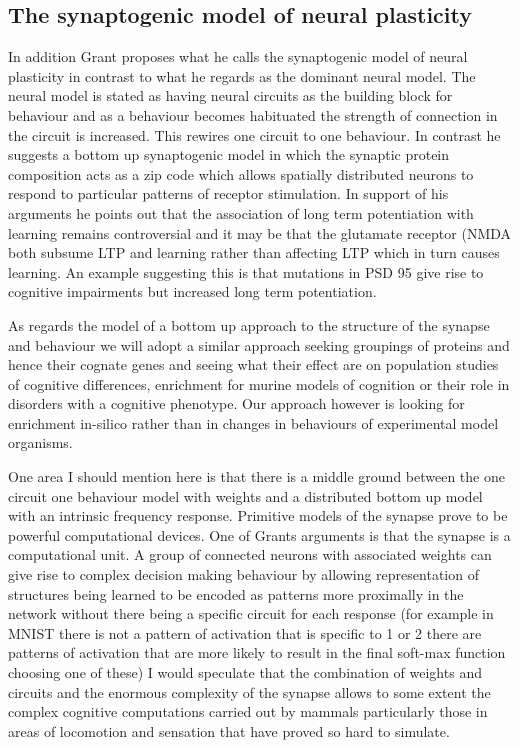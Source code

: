 \subsection{The synaptogenic model of neural plasticity}
In addition Grant proposes what he calls the synaptogenic model of neural plasticity in contrast to what he regards as the dominant neural model. The neural model is stated as having neural circuits as the building block for behaviour and as a behaviour becomes habituated the strength of connection in the circuit is increased. This rewires one circuit to one behaviour. In contrast he suggests a bottom up synaptogenic model in which the synaptic protein composition acts as a zip code which allows spatially distributed neurons to respond to particular patterns of receptor stimulation. In support of his arguments he points out that the association of long term potentiation with learning remains controversial and it may be that the glutamate receptor (NMDA both subsume LTP and learning rather than affecting LTP which in turn causes learning. An example suggesting this is that mutations in PSD 95 give rise to cognitive impairments but increased long term potentiation.

As regards the model of a bottom up approach to the structure of the synapse and behaviour we will adopt a similar approach seeking groupings of proteins and hence their cognate genes and seeing what their effect are on population studies of cognitive differences, enrichment for murine models of cognition or their role in disorders with a cognitive phenotype. Our approach however is looking for enrichment in-silico rather than in changes in behaviours of experimental model organisms. 

One area I should mention here is that there is a middle ground between the one circuit one behaviour model with weights and a distributed bottom up model with an intrinsic frequency response. Primitive models of the synapse prove to be powerful computational devices. One of Grants arguments is that the synapse is a computational unit. A group of connected neurons with associated weights can give rise to complex decision making behaviour by allowing representation of structures being learned to be encoded as patterns more proximally in the network without there being a specific circuit for each response (for example in MNIST there is not a pattern of activation that is specific to 1 or 2 there are patterns of activation that are more likely to result in the final soft-max function choosing one of these) I would speculate that the combination of weights and circuits and the enormous complexity of the synapse allows to some extent the complex cognitive computations carried out by mammals particularly those in areas of locomotion and sensation that have proved so hard to simulate.
